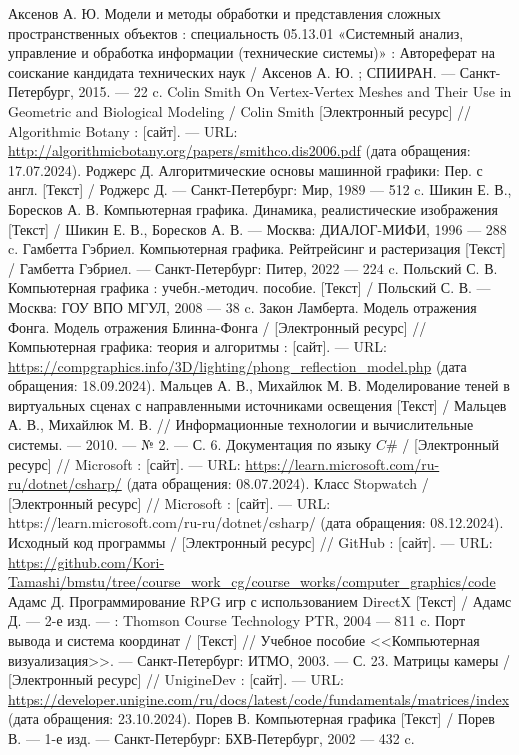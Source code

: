 \begin{thebibliography}{}
	 Аксенов А. Ю. Модели и методы обработки и представления сложных пространственных объектов : специальность 05.13.01 «Системный анализ, управление и обработка  информации (технические системы)» : Автореферат на соискание кандидата технических наук / Аксенов А. Ю. ; СПИИРАН. — Санкт-Петербург, 2015. — 22 c.
	 Colin Smith On Vertex-Vertex Meshes and Their Use in Geometric and Biological Modeling / Colin Smith [Электронный ресурс] // Algorithmic Botany : [сайт]. — URL: \url{http://algorithmicbotany.org/papers/smithco.dis2006.pdf} (дата обращения: 17.07.2024).
	 Роджерс Д. Алгоритмические основы машинной графики: Пер. с англ. [Текст] / Роджерс Д. — Санкт-Петербург: Мир, 1989 — 512 c.
	 Шикин Е. В., Боресков А. В. Компьютерная графика. Динамика, реалистические изображения [Текст] / Шикин Е. В., Боресков А. В. — Москва: ДИАЛОГ-МИФИ, 1996 — 288 c.
	 Гамбетта Гэбриел. Компьютерная графика. Рейтрейсинг и растеризация [Текст] / Гамбетта Гэбриел. — Санкт-Петербург: Питер, 2022 — 224 c.
	 Польский С. В. Компьютерная графика : учебн.-методич. пособие. [Текст] / Польский С. В. — Москва: ГОУ ВПО МГУЛ, 2008 — 38 c.
	 Закон Ламберта. Модель отражения Фонга. Модель отражения Блинна-Фонга /  [Электронный ресурс] // Компьютерная графика: теория и алгоритмы : [сайт]. — URL: \url{https://compgraphics.info/3D/lighting/phong_reflection_model.php} (дата обращения: 18.09.2024).
	 Мальцев А. В., Михайлюк М. В. Моделирование теней в виртуальных сценах с направленными источниками освещения [Текст] / Мальцев А. В., Михайлюк М. В. // Информационные технологии и вычислительные системы. — 2010. — № 2. — С. 6.
	  Документация по языку $C\#$ /  [Электронный ресурс] // Microsoft : [сайт]. — URL: \url{https://learn.microsoft.com/ru-ru/dotnet/csharp/} (дата обращения: 08.07.2024).
	  Класс Stopwatch /  [Электронный ресурс] // Microsoft : [сайт]. — URL: https://learn.microsoft.com/ru-ru/dotnet/csharp/ (дата обращения: 08.12.2024).
	  Исходный код программы /  [Электронный ресурс] // GitHub : [сайт]. — URL: \url{https://github.com/Kori-Tamashi/bmstu/tree/course_work_cg/course_works/computer_graphics/code}
	 Адамс Д. Программирование RPG игр с использованием DirectX [Текст] / Адамс Д. — 2-е изд. — : Thomson Course Technology PTR, 2004 — 811 c.
	 Порт вывода и система координат / [Текст] // Учебное пособие <<Компьютерная визуализация>>. — Санкт-Петербург: ИТМО, 2003. — С. 23.
	  Матрицы камеры /  [Электронный ресурс] // UnigineDev : [сайт]. — URL: \url{https://developer.unigine.com/ru/docs/latest/code/fundamentals/matrices/index} (дата обращения: 23.10.2024).
	 Порев В. Компьютерная графика [Текст] / Порев В. — 1-е изд. — Санкт-Петербург: БХВ-Петербург, 2002 — 432 c.
\end{thebibliography}
